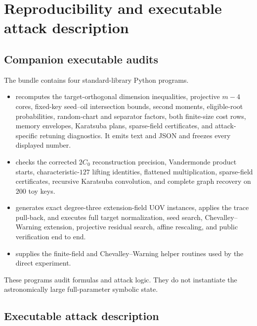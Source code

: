 \documentclass[11pt,a4paper]{article}
\theoremstyle{definition}
\theoremstyle{remark}
\begin{document}
\section{Reproducibility and executable attack description}\label{app:algorithms}

\subsection{Companion executable audits}

The bundle contains four standard-library Python programs.
\begin{itemize}
\item {} recomputes the target-orthogonal dimension
inequalities, projective $m-4$ cores, fixed-key seed--oil intersection bounds,
second moments, eligible-root probabilities, random-chart and separator
factors, both finite-size cost rows, memory envelopes, Karatsuba plans,
sparse-field certificates, and attack-specific retuning diagnostics.  It emits
text and JSON and freezes every displayed number.
\item {} checks the corrected $2C_0$
reconstruction precision, Vandermonde product starts, characteristic-$127$
lifting identities, flattened multiplication, sparse-field certificates,
recursive Karatsuba convolution, and complete graph recovery on $200$ toy keys.
\item {} generates exact degree-three extension-field
UOV instances, applies the trace pull-back, and executes full target
normalization, seed search, Chevalley--Warning extension, projective residual
search, affine rescaling, and public verification end to end.
\item {} supplies the finite-field and
Chevalley--Warning helper routines used by the direct experiment.
\end{itemize}
These programs audit formulas and attack logic.  They do not instantiate the
astronomically large full-parameter symbolic state.

\subsection{Executable attack description}
\end{document}
